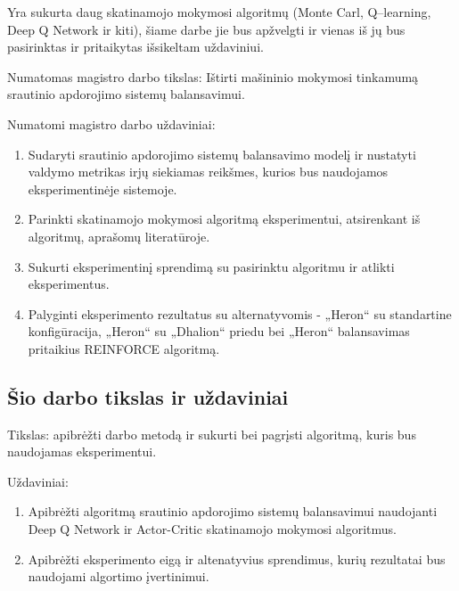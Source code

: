 \documentclass{VUMIFPSbakalaurinis}
\begin{document}
Yra sukurta daug skatinamojo mokymosi algoritmų (Monte Carl, Q–learning, Deep Q Network ir kiti), šiame darbe jie bus apžvelgti ir vienas iš jų bus pasirinktas ir pritaikytas išsikeltam uždaviniui. 

Numatomas magistro darbo tikslas: Ištirti mašininio mokymosi tinkamumą srautinio apdorojimo sistemų balansavimui. 

Numatomi magistro darbo uždaviniai:
\begin{enumerate}
    \item Sudaryti srautinio apdorojimo sistemų balansavimo modelį ir nustatyti valdymo metrikas irjų siekiamas reikšmes, kurios bus naudojamos eksperimentinėje sistemoje.
    \item Parinkti skatinamojo mokymosi algoritmą eksperimentui, atsirenkant iš algoritmų, aprašomų literatūroje.
    \item Sukurti eksperimentinį sprendimą su pasirinktu algoritmu ir atlikti eksperimentus.
    \item Palyginti eksperimento rezultatus su alternatyvomis - „Heron“ su standartine konfigūracija, „Heron“ su „Dhalion“ priedu bei „Heron“ balansavimas pritaikius REINFORCE algoritmą. 
\end{enumerate}


\subsection*{Šio darbo tikslas ir uždaviniai}
Tikslas: apibrėžti darbo metodą ir sukurti bei pagrįsti algoritmą, kuris bus naudojamas eksperimentui.

Uždaviniai:
\begin{enumerate}
    \item Apibrėžti algoritmą srautinio apdorojimo sistemų balansavimui naudojanti Deep Q Network ir Actor-Critic skatinamojo mokymosi algoritmus.
    \item Apibrėžti eksperimento eigą ir altenatyvius sprendimus, kurių rezultatai bus naudojami algortimo įvertinimui. 
\end{enumerate}
\end{document}
